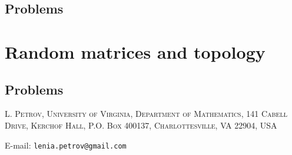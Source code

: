 \documentclass[letterpaper,11pt,oneside,reqno]{book}
\numberwithin{equation}{chapter}  %
\theoremstyle{definition}
\begin{document}
\section{Problems}
















\chapter{Random matrices and topology}
\label{chap:lecture15}










































\section{Problems}



















\medskip

\textsc{L. Petrov, University of Virginia, Department of Mathematics, 141 Cabell Drive, Kerchof Hall, P.O. Box 400137, Charlottesville, VA 22904, USA}

E-mail: \texttt{lenia.petrov@gmail.com}
\end{document}
